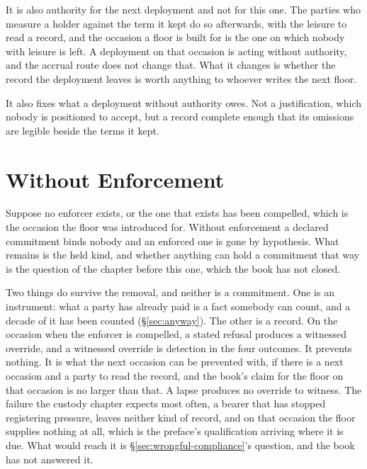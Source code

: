 It is also authority for the next deployment and not for this one. The
parties who measure a holder against the term it kept do so afterwards,
with the leisure to read a record, and the occasion a floor is built
for is the one on which nobody with leisure is left. A deployment on
that occasion is acting without authority, and the accrual route does
not change that. What it changes is whether the record the deployment
leaves is worth anything to whoever writes the next floor.

It also fixes what a deployment without authority
owes. Not a justification, which nobody is positioned to accept, but a
record complete enough that its omissions are legible beside the terms
it kept.

\section{Without Enforcement}
\label{sec:survives.enforcement}
Suppose no enforcer exists, or the one that exists has been compelled,
which is the occasion the floor was introduced for. Without enforcement a declared commitment binds nobody and an enforced one is gone
by hypothesis. What remains is the held kind, and whether anything can hold a commitment that way is the question of the chapter before this one,
which the book has not closed.

Two things do survive the removal, and neither is a commitment. One is
an instrument: what a party has already paid is a fact somebody can
count, and a decade of it has been counted (§\ref{sec:anyway}). The other
is a record. On the occasion when the enforcer is compelled, a stated
refusal produces a witnessed override, and a witnessed override is
detection in the four outcomes. It prevents nothing. It is what the next
occasion can be prevented with, if there is a next occasion and a party
to read the record, and the book's claim for the floor on that occasion is no larger than that. A lapse produces no override to witness. The failure the custody chapter expects most often, a bearer that has stopped registering pressure, leaves neither kind of record, and on that occasion the floor supplies nothing at all, which is the preface's qualification arriving where it is due. What would reach it is §\ref{sec:wrongful-compliance}'s question, and the book has not answered it.
